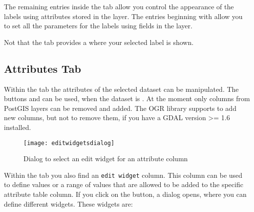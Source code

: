 The remaining entries inside the  tab allow you control the appearance of the
labels using attributes stored in the layer. The entries beginning with  allow you to
set all the parameters for the labels using fields in the layer.

Not that the  tab provides a  where your
selected label is shown.

\subsection{Attributes Tab}\label{label_attributes}

Within the  tab the attributes of the selected dataset can be
manipulated. The buttons  and
 can be
used, when the dataset is .
At the moment only columns from PostGIS layers can be removed and added. The
OGR library supports to add new columns, but not to remove them, if you have
a GDAL version >= 1.6 installed.


\begin{figure}[H]
   \begin{center}
   \caption{Dialog to select an edit widget for an attribute column
\nixcaption}\label{fig:editwidget}\smallskip
   \texttt{[image: editwidgetsdialog]}
\end{center}
\end{figure}

Within the  tab you also find an \texttt{edit widget} column.
This column can be used to define values or a range of values that are
allowed
to be added to the specific attribute table column. If you click on the
 button, a dialog opens, where you can define different
widgets. These widgets are:

